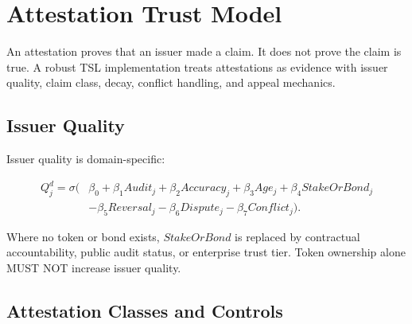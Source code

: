 \documentclass[11pt]{article}
\newcommand{\TSL}{\textsc{TSL}}
\begin{document}
\section{Attestation Trust Model}

An attestation proves that an issuer made a claim. It does not prove the claim is true. A robust \TSL{} implementation treats attestations as evidence with issuer quality, claim class, decay, conflict handling, and appeal mechanics.

\subsection{Issuer Quality}

Issuer quality is domain-specific:

\begin{equation}
\begin{aligned}
Q_j^d=\sigma(&\beta_0+\beta_1Audit_j+\beta_2Accuracy_j+\beta_3Age_j+\beta_4StakeOrBond_j\\
&-\beta_5Reversal_j-\beta_6Dispute_j-\beta_7Conflict_j).
\end{aligned}
\end{equation}

Where no token or bond exists, \(StakeOrBond\) is replaced by contractual accountability, public audit status, or enterprise trust tier. Token ownership alone MUST NOT increase issuer quality.

\subsection{Attestation Classes and Controls}
\end{document}
